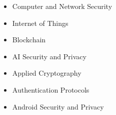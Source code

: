 \begin{cvparagraph}
    \begin{itemize}[leftmargin=*]
		\item {Computer and Network Security} 
		\item {Internet of Things} 
		\item {Blockchain}
		\item {AI Security and Privacy}
		\item {Applied Cryptography}
		\item {Authentication Protocols}
		\item {Android Security and Privacy}
    \end{itemize}
\end{cvparagraph}
